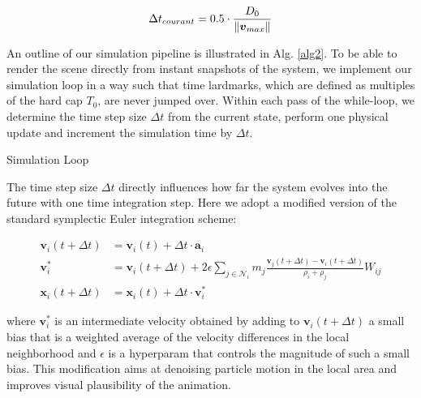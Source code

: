 \documentclass[
	11pt, 
	DIV10,
	ngerman,
	a4paper, 
	oneside, 
	headings=normal, 
	captions=tableheading,
	final, 
	numbers=noenddot
]{scrartcl}
\DeclarePairedDelimiter{\norm}{\lVert}{\rVert}
\begin{document}
\begin{equation}
	\label{eq16}
	\Delta t_{courant} = 0.5 \cdot \frac{D_{0}}{\norm{\boldsymbol{v}_{max}}}
\end{equation}

An outline of our simulation pipeline is illustrated in Alg. \ref{alg2}. To be able to render the scene directly from instant snapshots of the system, we implement our simulation loop in a way such that time lardmarks, which are defined as multiples of the hard cap $ T_{0} $, are never jumped over. Within each pass of the while-loop, we determine the time step size $ \Delta t $ from the current state, perform one physical update and increment the simulation time by $ \Delta t $.

\large
\begin{algorithm}
	\SetAlgoLined
	\caption{\label{alg2} Simulation Loop}
\end{algorithm}
\normalsize

The time step size $ \Delta t $ directly influences how far the system evolves into the future with one time integration step. Here we adopt a modified version of the standard symplectic Euler integration scheme:

\begin{align}
	\label{eq17} \mathbf{v}_{i}(t + \Delta t) &= \mathbf{v}_{i}(t) + \Delta t \cdot \mathbf{a}_{i} \\[1em]
	\label{eq18} \mathbf{v}_{i}^{*} &= \mathbf{v}_{i}(t + \Delta t) + 2\epsilon \sum_{j \in \mathcal{N}_{i}} m_{j} \frac{\mathbf{v}_{j}(t + \Delta t) - \mathbf{v}_{i}(t + \Delta t)}{\rho_{i} + \rho_{j}} W_{ij} \\[0.5em]
	\label{eq19} \mathbf{x}_{i}(t + \Delta t) &= \mathbf{x}_{i}(t) + \Delta t \cdot \mathbf{v}_{i}^{*}
\end{align}

where $ \mathbf{v}_{i}^{*} $ is an intermediate velocity obtained by adding to $ \mathbf{v}_{i}(t + \Delta t) $ a small bias that is a weighted average of the velocity differences in the local neighborhood and $ \epsilon $ is a hyperparam that controls the magnitude of such a small bias. This modification aims at denoising particle motion in the local area and improves visual plausibility of the animation.
\end{document}
